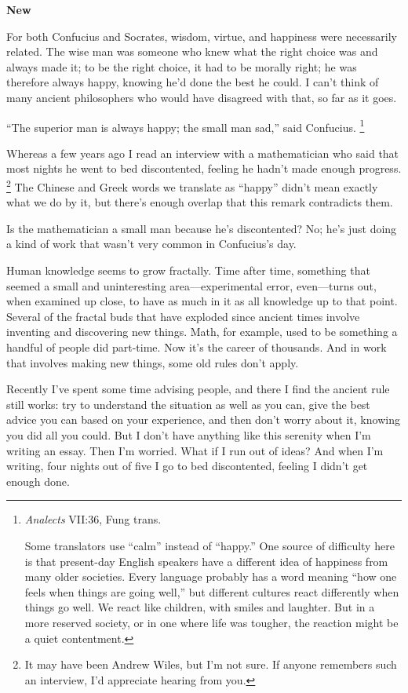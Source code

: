 \documentclass[12pt]{book}
\begin{document}
\textbf{New}

For both Confucius and Socrates, wisdom, virtue, and happiness were
necessarily related. The wise man was someone who knew what the right
choice was and always made it; to be the right choice, it had to be
morally right; he was therefore always happy, knowing he'd done the best
he could. I can't think of many ancient philosophers who would have
disagreed with that, so far as it goes.

``The superior man is always happy; the small man sad,'' said Confucius.
\footnote{\emph{Analects} VII:36, Fung trans.

Some translators use ``calm'' instead of ``happy.'' One source of
difficulty here is that present-day English speakers have a different
idea of happiness from many older societies. Every language probably has
a word meaning ``how one feels when things are going well,'' but
different cultures react differently when things go well. We react like
children, with smiles and laughter. But in a more reserved society, or
in one where life was tougher, the reaction might be a quiet
contentment.}

Whereas a few years ago I read an interview with a mathematician who
said that most nights he went to bed discontented, feeling he hadn't
made enough progress. \footnote{It may have been Andrew Wiles, but I'm not sure. If anyone
remembers such an interview, I'd appreciate hearing from you.} The Chinese and Greek
words we translate as ``happy'' didn't mean exactly what we do by it,
but there's enough overlap that this remark contradicts them.

Is the mathematician a small man because he's discontented? No; he's
just doing a kind of work that wasn't very common in Confucius's day.

Human knowledge seems to grow fractally. Time after time, something that
seemed a small and uninteresting area---experimental error, even---turns
out, when examined up close, to have as much in it as all knowledge up
to that point. Several of the fractal buds that have exploded since
ancient times involve inventing and discovering new things. Math, for
example, used to be something a handful of people did part-time. Now
it's the career of thousands. And in work that involves making new
things, some old rules don't apply.

Recently I've spent some time advising people, and there I find the
ancient rule still works: try to understand the situation as well as you
can, give the best advice you can based on your experience, and then
don't worry about it, knowing you did all you could. But I don't have
anything like this serenity when I'm writing an essay. Then I'm worried.
What if I run out of ideas? And when I'm writing, four nights out of
five I go to bed discontented, feeling I didn't get enough done.
\end{document}
